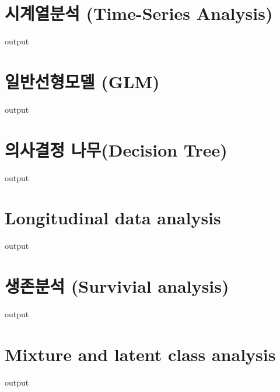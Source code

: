 \section{시계열분석 (Time-Series Analysis) }
\begin{Schunk}
\begin{Soutput}
output
\end{Soutput}
\end{Schunk}

\section{일반선형모델 (GLM)}
\begin{Schunk}
\begin{Soutput}
output
\end{Soutput}
\end{Schunk}

\section{의사결정 나무(Decision Tree)}
\begin{Schunk}
\begin{Soutput}
output
\end{Soutput}
\end{Schunk}

\section{Longitudinal data analysis}
\begin{Schunk}
\begin{Soutput}
output
\end{Soutput}
\end{Schunk}

\section{생존분석 (Survivial analysis)}
\begin{Schunk}
\begin{Soutput}
output
\end{Soutput}
\end{Schunk}

\section{Mixture and latent class analysis}
\begin{Schunk}
\begin{Soutput}
output
\end{Soutput}
\end{Schunk}

